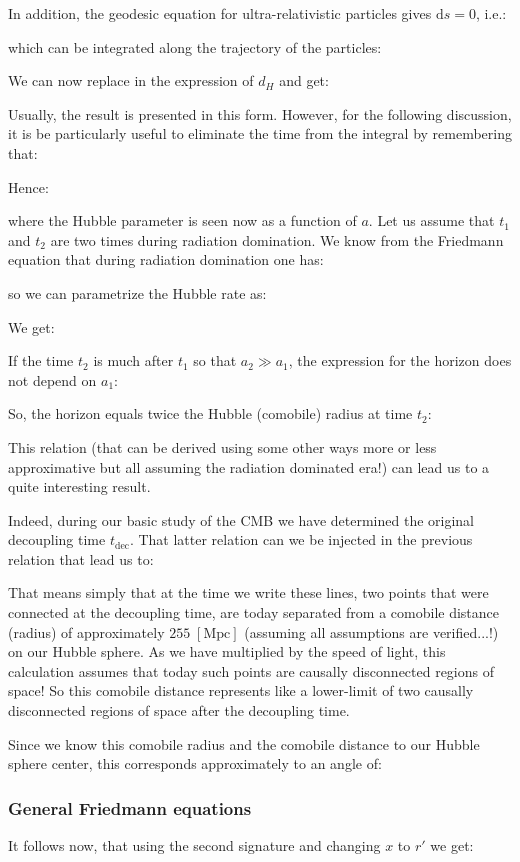 	In addition, the geodesic equation for ultra-relativistic particles gives $\mathrm{d}s = 0$, i.e.:
	
	which can be integrated along the trajectory of the particles:
	
	We can now replace in the expression of $d_H$ and get:
	
	Usually, the result is presented in this form. However, for the following discussion, it is be particularly useful to eliminate the time from the integral by remembering that:
		
	Hence:
	
	where the Hubble parameter is seen now as a function of $a$. Let us assume that $t_1$ and $t_2$ are two times during radiation domination. We know from the Friedmann equation that during radiation domination one has:
	
	so we can parametrize the Hubble rate as:
	
	We get:
	
	If the time $t_2$ is much after $t_1$ so that $a_2 \gg a_1$, the expression for the horizon does not depend on $a_1$:
	
	So, the horizon equals twice the Hubble (comobile) radius at time $t_2$:
	
	This relation (that can be derived using some other ways more or less approximative but all assuming the radiation dominated era!) can lead us to a quite interesting result.
	
	 Indeed, during our basic study of the CMB we have determined the original decoupling time $t_\text{dec}$. That latter relation can we be injected in the previous relation that lead us to:
	
	That means simply that at the time we write these lines, two points that were connected at the decoupling time, are today separated from a comobile distance (radius) of approximately $255 \;[\text{Mpc}]$ (assuming all assumptions are verified...!) on our Hubble sphere. As we have multiplied by the speed of light, this calculation assumes that today such points are causally disconnected regions of space! So this comobile distance represents like a lower-limit of two causally disconnected regions of space after the decoupling time.
	
	 Since we know this comobile radius and the comobile distance to our Hubble sphere center, this corresponds approximately to an angle of:
	
	
	\subsubsection{General Friedmann equations}
	It follows now, that using the second signature and changing $x$ to $r'$ we get:
	
